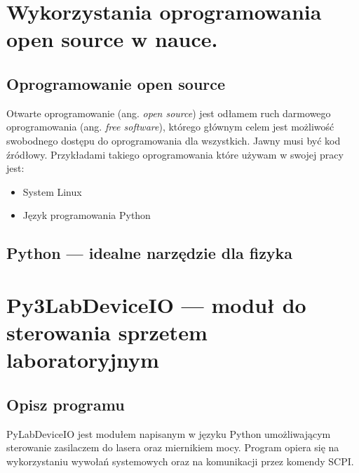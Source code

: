 \documentclass[a4paper, portrait,12pt]{report}
\begin{document}
\newpage
\chapter{Wykorzystania oprogramowania open source w nauce.}
\section{Oprogramowanie open source}
Otwarte oprogramowanie (ang. \textit{open source}) jest odłamem ruch darmowego oprogramowania (ang. \textit{free software}), którego głównym celem jest możliwość swobodnego dostępu do oprogramowania dla wszystkich. Jawny musi być kod źródłowy. Przykładami takiego oprogramowania które używam w swojej pracy jest:
\begin{itemize}
\item System Linux
\item Język programowania Python
\end{itemize}
\section{Python --- idealne narzędzie dla fizyka}
\chapter{Py3LabDeviceIO --- moduł do sterowania sprzetem laboratoryjnym}
\section{Opisz programu}
PyLabDeviceIO jest modułem napisanym w języku Python umożliwającym sterowanie zasilaczem do lasera oraz miernikiem mocy. Program opiera się na wykorzystaniu wywołań systemowych oraz na komunikacji przez komendy SCPI. \\
\end{document}
